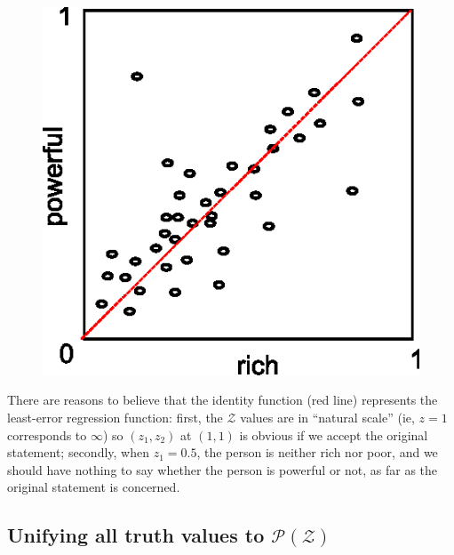\begin{figure}[H]
\centering
\includegraphics{rich-vs-powerful.eps}
\end{figure}

There are reasons to believe that the identity function (red line) represents the least-error regression function:  first, the $\mathcal{Z}$ values are in ``natural scale'' (ie, $z=1$ corresponds to $\infty$) so $(z_1,z_2)$ at $(1,1)$ is obvious if we accept the original statement;  secondly, when $z_1 = 0.5$, the person is neither rich nor poor, and we should have nothing to say whether the person is powerful or not, as far as the original statement is concerned.

\underconst

\subsection{Unifying all truth values to $\mathcal{P(Z)}$}
\label{sec:unifying-P(Z)}

